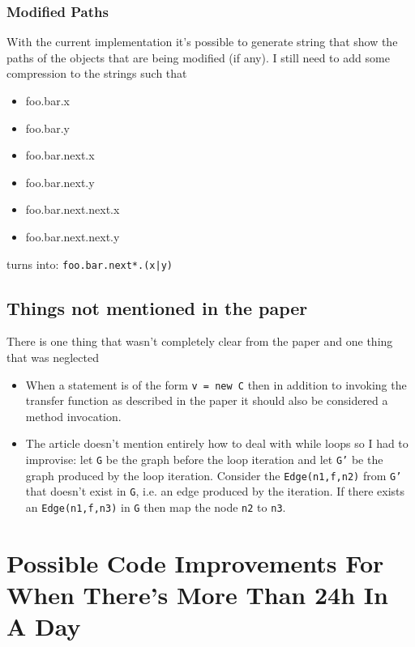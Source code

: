 \documentclass[11pt]{exam}
\begin{document}
\subsubsection{Modified Paths}
\label{subsub:mp}

With the current implementation it's possible to generate string that show the paths of the objects that are being modified (if any). I still need to add some compression to the strings such that

\begin{itemize}
  \setlength{\itemsep}{1pt}
  \setlength{\parskip}{0pt}
  \item foo.bar.x
  \item foo.bar.y
  \item foo.bar.next.x
  \item foo.bar.next.y
  \item foo.bar.next.next.x
  \item foo.bar.next.next.y
\end{itemize}

turns into: \texttt{foo.bar.next*.(x|y)}

\subsection{Things not mentioned in the paper}

There is one thing that wasn't completely clear from the paper and one thing that was neglected

\begin{itemize}
  \item When a statement is of the form \texttt{v = new C} then in addition to invoking the transfer function as described in the paper it should also be considered a method invocation.
  \item The article doesn't mention entirely how to deal with while loops so I had to improvise: let \texttt{G} be the graph before the loop iteration and let \texttt{G'} be the graph produced by the loop iteration. Consider the \texttt{Edge(n1,f,n2)} from \texttt{G'} that doesn't exist in \texttt{G}, i.e. an edge produced by the iteration. If there exists an \texttt{Edge(n1,f,n3)} in \texttt{G} then map the node \texttt{n2} to \texttt{n3}.
\end{itemize}

\newpage

\section{Possible Code Improvements For When There's More Than 24h In A Day}
\end{document}
